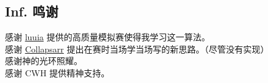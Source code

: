 \documentclass[
]{article}
\begin{document}
\subsection{Inf. 鸣谢}\label{inf-ux9e23ux8c22}

感谢 \href{https://luogu.com.cn/user/557800}{luuia}
提供的高质量模拟赛使得我学习这一算法。\\
感谢 \href{https://luogu.com.cn/user/716122}{Collapsarr}
提出在赛时当场学当场写的新思路。（尽管没有实现）\\
感谢神的光环照耀。\\
感谢 CWH 提供精神支持。
\end{document}
